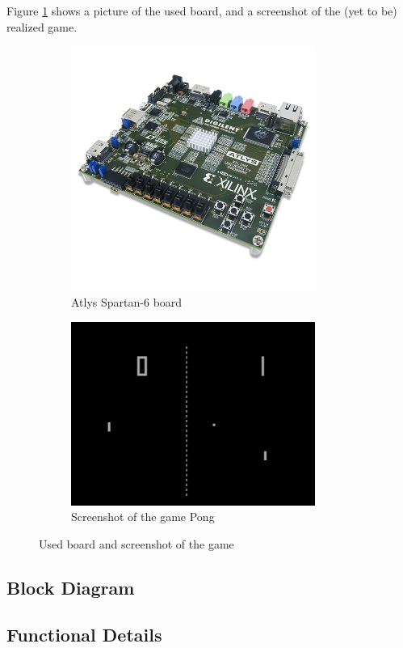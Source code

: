 \documentclass[12pt]{article}
\begin{document}
	Figure \ref{board+screenshot} shows a picture of the used board, and a screenshot of the (yet to be) realized game. 
	
	\begin{figure}[h]
		\begin{subfigure}[b]{.4\textwidth}
			\includegraphics[width=8cm]{atlys_pic.png}
			\caption{Atlys Spartan-6 board}
		\end{subfigure}
		\hfill
		\begin{subfigure}[b]{.4\textwidth}
			\includegraphics[width=8cm]{pong_screenshot.png}		
			\caption{Screenshot of the game Pong}
		\end{subfigure}
		
	\caption{Used board and screenshot of the game}
	\label{board+screenshot}
	\end{figure}
	
	
	\subsection{Block Diagram}
	\subsection{Functional Details}
	
\end{document}
